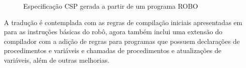 \begin{figure}[h]
\centering
\caption{Especificação CSP gerada a partir de um programa ROBO}

\label{fig:progcsp}
\end{figure}

A tradução é contemplada com as regras de compilação iniciais apresentadas em \cite{nogueira} para as instruções básicas do robô, agora também inclui uma extensão do compilador com a adição de regras para programas que possuem declarações de procedimentos e variáveis e chamadas de procedimentos e atualizações de variáveis, além de outras melhorias.

